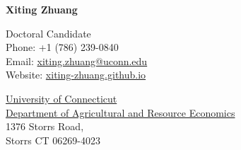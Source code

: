 \documentclass[11 pt,letterpaper]{article}
\def\name{Xiting Zhuang}
\begin{document}
	
	{\huge \textbf{\name}}
	
	
	\vspace{0.25in}
	
	\begin{minipage}[t]{0.45\textwidth}
		Doctoral Candidate \\
		Phone: +1 (786) 239-0840 \\
		Email: \href{mailto:xiting.zhuang@uconn.edu}{xiting.zhuang@uconn.edu} \\
		Website: \href{https://xiting-zhuang.github.io}{xiting-zhuang.github.io} \\
		
	\end{minipage}
	\begin{minipage}[t]{0.6\textwidth}
		\href{https://uconn.edu/}{University of Connecticut} \\
		\href{https://are.uconn.edu/}{Department of Agricultural and Resource Economics} \\
		1376 Storrs Road,  	\\
		Storrs CT 06269-4023 
	\end{minipage}
	
\end{document}
